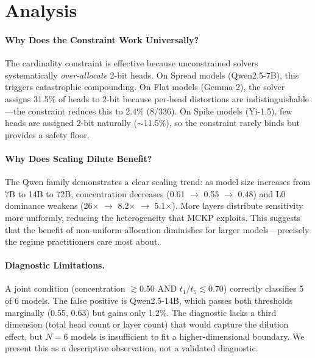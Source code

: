 \documentclass[11pt,a4paper]{article}
\begin{document}
\section{Analysis}

\paragraph{Why Does the Constraint Work Universally?}
The cardinality constraint is effective because unconstrained solvers systematically \emph{over-allocate} 2-bit heads. On Spread models (Qwen2.5-7B), this triggers catastrophic compounding. On Flat models (Gemma-2), the solver assigns 31.5\% of heads to 2-bit because per-head distortions are indistinguishable---the constraint reduces this to 2.4\% (8/336). On Spike models (Yi-1.5), few heads are assigned 2-bit naturally ($\sim$11.5\%), so the constraint rarely binds but provides a safety floor.

\paragraph{Why Does Scaling Dilute Benefit?}
The Qwen family demonstrates a clear scaling trend: as model size increases from 7B to 14B to 72B, concentration decreases (0.61 $\to$ 0.55 $\to$ 0.48) and L0 dominance weakens (26$\times$ $\to$ 8.2$\times$ $\to$ 5.1$\times$). More layers distribute sensitivity more uniformly, reducing the heterogeneity that MCKP exploits. This suggests that the benefit of non-uniform allocation diminishes for larger models---precisely the regime practitioners care most about.

\paragraph{Diagnostic Limitations.}
A joint condition (concentration $\gtrsim$0.50 AND $t_1/t_5 \lesssim$0.70) correctly classifies 5 of 6 models. The false positive is Qwen2.5-14B, which passes both thresholds marginally (0.55, 0.63) but gains only 1.2\%. The diagnostic lacks a third dimension (total head count or layer count) that would capture the dilution effect, but $N{=}6$ models is insufficient to fit a higher-dimensional boundary. We present this as a descriptive observation, not a validated diagnostic.

\end{document}
